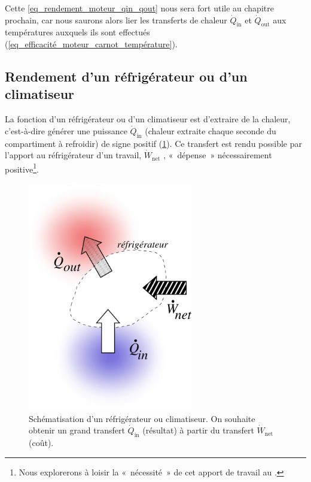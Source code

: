 			Cette \cref{eq_rendement_moteur_qin_qout} nous sera fort utile au chapitre prochain, car nous saurons alors lier les transferts de chaleur $\dot{Q}_\text{in}$ et $\dot{Q}_\text{out}$ aux températures auxquels ils sont effectués (\ref{eq_efficacité_moteur_carnot_température}).



		\subsection{Rendement d’un réfrigérateur ou d’un climatiseur}
		\label{ch_rendement_réfrigérateur}

			La fonction d’un réfrigérateur ou d’un climatiseur est d’extraire de la chaleur, c’est-à-dire générer une puissance $\dot{Q}_\text{in}$ (chaleur extraite chaque seconde du compartiment à refroidir) de signe positif (\cref{fig_transferts_réfrigérateur}). Ce transfert est rendu possible par l’apport au réfrigérateur d’un travail, $\dot{W}_\text{net}$ , «~dépense~» nécessairement positive\footnote{Nous explorerons à loisir la «~nécessité~» de cet apport de travail au \courssept.}\nolinebreak.

			\begin{figure}
				\begin{center}
					\includegraphics[height=10cm]{images/eff_refrigerateur.png}
				\end{center}
				\caption{Schématisation d’un réfrigérateur ou climatiseur.
			On souhaite obtenir un grand transfert $\dot{Q}_\text{in}$ (résultat) à partir du transfert $\dot{W}_\text{net}$ (coût).}
				\label{fig_transferts_réfrigérateur}
			\end{figure}

